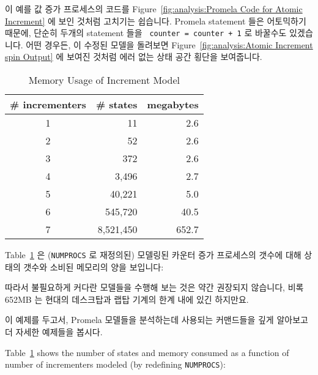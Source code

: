 이 예를 값 증가 프로세스의 코드를
Figure~\ref{fig:analysis:Promela Code for Atomic Increment} 에 보인 것처럼
고치기는 쉽습니다.
Promela statement 들은 어토믹하기 때문에, 단순히 두개의 statement 들을 {\tt
counter = counter + 1} 로 바꿀수도 있겠습니다.
어떤 경우든, 이 수정된 모델을 돌려보면
Figure~\ref{fig:analysis:Atomic Increment spin Output} 에 보여진 것처럼 에러
없는 상태 공간 횡단을 보여줍니다.
\iffalse

It is easy to fix this example by placing the body of the incrementer
processes in an atomic blocks as shown in
Figure~\ref{fig:analysis:Promela Code for Atomic Increment}.
One could also have simply replaced the pair of statements with
{\tt counter = counter + 1}, because Promela statements are
atomic.
Either way, running this modified model gives us an error-free traversal
of the state space, as shown in
Figure~\ref{fig:analysis:Atomic Increment spin Output}.
\fi

\begin{table}
\footnotesize
\centering
\begin{tabular}{c|r|r}
	\# incrementers & \# states &	megabytes \\
	\hline
	\hline
	1 &		        11 &          2.6 \\
	\hline
	2 &		        52 &          2.6 \\
	\hline
	3 &		       372 &          2.6 \\
	\hline
	4 &		     3,496 &          2.7 \\
	\hline
	5 &		    40,221 &          5.0 \\
	\hline
	6 &		   545,720 &         40.5 \\
	\hline
	7 &		 8,521,450 &        652.7 \\
\end{tabular}
\caption{Memory Usage of Increment Model}
\label{tab:advsync:Memory Usage of Increment Model}
\end{table}

Table~\ref{tab:advsync:Memory Usage of Increment Model}
은 ({\tt NUMPROCS} 로 재정의된) 모델링된 카운터 증가 프로세스의 갯수에 대해
상태의 갯수와 소비된 메모리의 양을 보입니다:

따라서 불필요하게 커다란 모델들을 수행해 보는 것은 약간 권장되지 않습니다, 비록
652MB 는 현대의 데스크탑과 랩탑 기계의 한계 내에 있긴 하지만요.

이 예제를 두고서, Promela 모델들을 분석하는데 사용되는 커맨드들을 깊게 알아보고
더 자세한 예제들을 봅시다.
\iffalse

Table~\ref{tab:advsync:Memory Usage of Increment Model}
shows the number of states and memory consumed
as a function of number of incrementers modeled
(by redefining {\tt NUMPROCS}):

